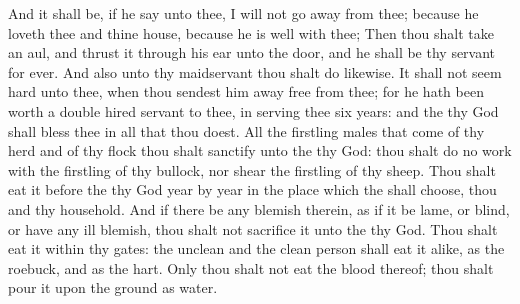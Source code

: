 \begin{biblechapter}
\verse And it shall be, if he say unto thee, I will not go away from thee; because he loveth thee and thine house, because he is well with thee;
\verse Then thou shalt take an aul, and thrust it through his ear unto the door, and he shall be thy servant for ever. And also unto thy maidservant thou shalt do likewise.
\verse It shall not seem hard unto thee, when thou sendest him away free from thee; for he hath been worth a double hired servant to thee, in serving thee six years: and the \LORD thy God shall bless thee in all that thou doest.
 All the firstling males that come of thy herd and of thy flock thou shalt sanctify unto the \LORD thy God: thou shalt do no work with the firstling of thy bullock, nor shear the firstling of thy sheep.
\verse Thou shalt eat it before the \LORD thy God year by year in the place which the \LORD shall choose, thou and thy household.
\verse And if there be any blemish therein, as if it be lame, or blind, or have any ill blemish, thou shalt not sacrifice it unto the \LORD thy God.
\verse Thou shalt eat it within thy gates: the unclean and the clean person shall eat it alike, as the roebuck, and as the hart.
\verse Only thou shalt not eat the blood thereof; thou shalt pour it upon the ground as water.
\end{biblechapter}


